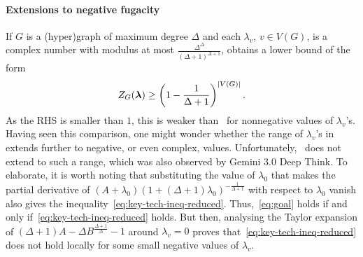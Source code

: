 \documentclass{article}
\numberwithin{equation}{section}
\theoremstyle{plain}
\theoremstyle{definition}
\theoremstyle{remark} %
\DeclarePairedDelimiter{\abs}{\lvert}{\rvert}
\newcommand{\blambda}{\bm{\lambda}}
\begin{document}
\paragraph{Extensions to negative fugacity}  If $G$ is a (hyper)graph of maximum degree $\Delta$ and each $\lambda_v$, $v\in V(G)$, is a complex number with modulus at most $\frac{\Delta^\Delta}{(\Delta+1)^{\Delta+1}}$, \cite[Theorem~10]{GMPST_2024} obtains a lower bound of the form
\begin{align*}
    Z_G(\blambda)\geq \left(1-\frac{1}{\Delta+1}\right)^{\abs{V(G)}}.
\end{align*}
As the RHS is smaller than $1$, this is weaker than~ for nonnegative values of $\lambda_v$'s.
Having seen this comparison, one might wonder whether the range of $\lambda_v$'s in~ extends further to negative, or even complex, values. Unfortunately,~ does not extend to such a range, which was also observed by Gemini 3.0 Deep Think.
To elaborate, it is worth noting that substituting the value of $\lambda_0$ that makes the partial derivative of $(A+\lambda_0)(1+(\Delta+1)\lambda_0)^{-\frac{1}{\Delta+1}}$ with respect to $\lambda_0$ vanish also gives the inequality~\eqref{eq:key-tech-ineq-reduced}. Thus,~\eqref{eq:goal} holds if and only if~\eqref{eq:key-tech-ineq-reduced} holds. But then, analysing the Taylor expansion of $(\Delta+1)A-\Delta B^{\frac{\Delta+1}{\Delta}}-1$ around $\lambda_v=0$ proves that~\eqref{eq:key-tech-ineq-reduced} does not hold locally for some small negative values of $\lambda_v$.
\end{document}
